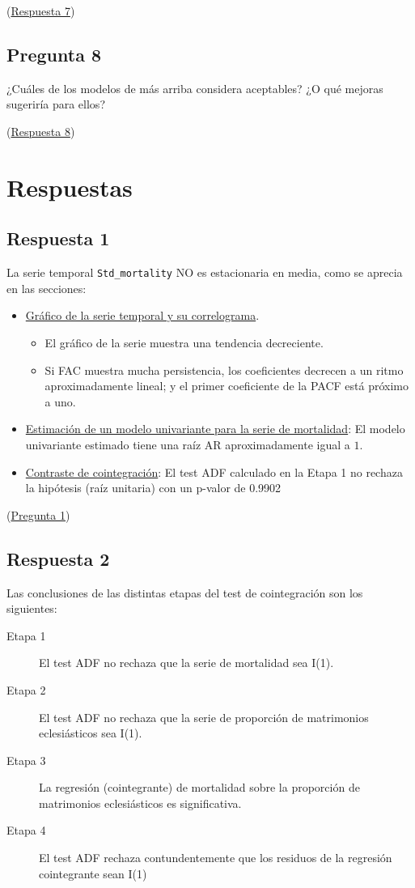 \documentclass[10pt]{article}
\begin{document}
(\hyperref[sec:orgaa60221]{Respuesta 7})
\subsection*{Pregunta 8}
\label{sec:org6bb2298}

¿Cuáles de los modelos de más arriba considera aceptables? ¿O qué
mejoras sugeriría para ellos?

(\hyperref[sec:org7490a39]{Respuesta 8})
\section*{Respuestas}
\label{sec:org1a439d5}

\subsection*{Respuesta 1}
\label{sec:orgccff763}

La serie temporal \texttt{Std\_mortality} NO es estacionaria en media, como se
aprecia en las secciones:
\begin{itemize}
\item \hyperref[sec:orgcc82df0]{Gráfico de la serie temporal y su correlograma}. 
\begin{itemize}
\item El gráfico de la serie muestra una tendencia decreciente.
\item Si FAC muestra mucha persistencia, los coeficientes decrecen a un
ritmo aproximadamente lineal; y el primer coeficiente de la PACF
está próximo a uno.
\end{itemize}
\item \hyperref[sec:orga279f63]{Estimación de un modelo univariante para la serie de mortalidad}: El
modelo univariante estimado tiene una raíz AR aproximadamente igual
a \(1\).
\item \hyperref[sec:org6ae8cb0]{Contraste de cointegración}: El test ADF calculado en la Etapa 1 no
rechaza la hipótesis (raíz unitaria) con un p-valor de 0.9902
\end{itemize}

(\hyperref[sec:org9c5855f]{Pregunta 1})
\subsection*{Respuesta 2}
\label{sec:orgdcbc4ea}

Las conclusiones de las distintas etapas del test de cointegración son los siguientes:
\begin{description}
\item[{Etapa 1}] El test ADF no rechaza que la serie de mortalidad sea I(1).
\item[{Etapa 2}] El test ADF no rechaza que la serie de proporción de
matrimonios eclesiásticos sea I(1).
\item[{Etapa 3}] La regresión (cointegrante) de mortalidad sobre la
proporción de matrimonios eclesiásticos es significativa.
\item[{Etapa 4}] El test ADF rechaza contundentemente que los residuos de
la regresión cointegrante sean I(1)
\end{description}
\end{document}
